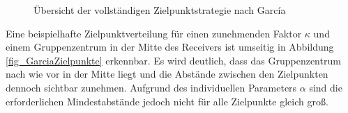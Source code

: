 \begin{figure}[p]
    \centering
    \setlength{\fboxsep}{1pt}
    \setlength{\fboxrule}{1pt}
\caption[Übersicht der vollständigen Zielpunktstrategie nach García]{Übersicht der vollständigen Zielpunktstrategie nach García \cite[S.10]{Garcia2}}
    \label{fig_GarciaAlg}
\end{figure}

Eine beispielhafte Zielpunktverteilung für einen zunehmenden Faktor $\kappa$ und einem Gruppenzentrum in der Mitte des Receivers ist umseitig in Abbildung \ref{fig_GarciaZielpunkte} erkennbar.
Es wird deutlich, dass das Gruppenzentrum nach wie vor in der Mitte liegt und die Abstände zwischen den Zielpunkten dennoch sichtbar zunehmen.
Aufgrund des individuellen Parameters $\alpha$ sind die erforderlichen Mindestabstände jedoch nicht für alle Zielpunkte gleich groß.

